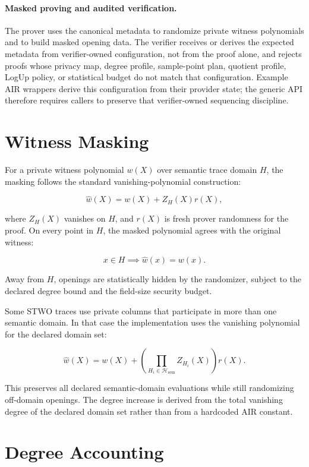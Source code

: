 \documentclass[11pt]{article}
\begin{document}
\paragraph{Masked proving and audited verification.}
The prover uses the canonical metadata to randomize private witness polynomials
and to build masked opening data. The verifier receives or derives the expected
metadata from verifier-owned configuration, not from the proof alone, and rejects
proofs whose privacy map, degree profile, sample-point plan, quotient profile,
LogUp policy, or statistical budget do not match that configuration. Example AIR
wrappers derive this configuration from their provider state; the generic API
therefore requires callers to preserve that verifier-owned sequencing discipline.

\section{Witness Masking}

For a private witness polynomial \(w(X)\) over semantic trace domain \(H\), the
masking follows the standard vanishing-polynomial construction:

\[
    \widehat{w}(X) = w(X) + Z_H(X) r(X),
\]

where \(Z_H(X)\) vanishes on \(H\), and \(r(X)\) is fresh prover randomness for
the proof. On every point in \(H\), the masked polynomial agrees with the original
witness:

\[
    x \in H \implies \widehat{w}(x) = w(x).
\]

Away from \(H\), openings are statistically hidden by the randomizer, subject to
the declared degree bound and the field-size security budget.

Some STWO traces use private columns that participate in more than one semantic
domain. In that case the implementation uses the vanishing polynomial for the
declared domain set:

\[
    \widehat{w}(X)
    =
    w(X)
    +
    \left(\prod_{H_i \in \mathcal{H}_{\mathrm{sem}}} Z_{H_i}(X)\right) r(X).
\]

This preserves all declared semantic-domain evaluations while still randomizing
off-domain openings. The degree increase is derived from the total vanishing
degree of the declared domain set rather than from a hardcoded AIR constant.

\section{Degree Accounting}
\end{document}
